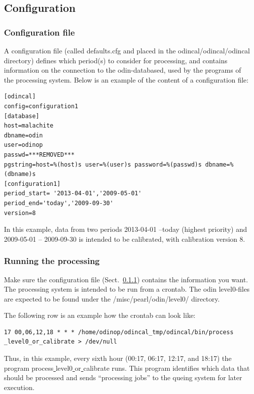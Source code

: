 \documentclass[12pt]{article}
\begin{document}
\subsection{Configuration}
\subsubsection{Configuration file}
\label{sec:config}
A configuration file (called defaults.cfg and placed
in the odincal/odincal/odincal directory) defines which period(s) to consider
for processing, and contains information on the connection
to the odin-databased, used by the programs of the processing system.
Below is an example of the content of a configuration file:
\begin{verbatim}
[odincal]
config=configuration1
[database]
host=malachite
dbname=odin
user=odinop
passwd=***REMOVED***
pgstring=host=%(host)s user=%(user)s password=%(passwd)s dbname=%(dbname)s
[configuration1]
period_start= '2013-04-01','2009-05-01'
period_end='today','2009-09-30'
version=8
\end{verbatim}
In this example, data from two periods 2013-04-01 --today (highest priority)
and 2009-05-01 -- 2009-09-30
is intended to be calibrated, with calibration version 8.

\subsubsection{Running the processing}
Make sure the configuration file (Sect.~\ref{sec:config}) contains
the information you want.  
The processing system is intended to be run from a crontab.
The odin level0-files are expected to be found
under the /misc/pearl/odin/level0/ directory.

The following row is an example how the crontab can look like: 
\begin{verbatim}
17 00,06,12,18 * * * /home/odinop/odincal_tmp/odincal/bin/process
_level0_or_calibrate > /dev/null
\end{verbatim}
Thus, in this example, every sixth hour (00:17, 06:17, 12:17, and 18:17)
the program process\underline{ }level0\underline{ }or\underline{ }calibrate
runs. This program identifies which data that should be processed
and sends ``processing jobs'' to the queing system for later execution.
\end{document}
